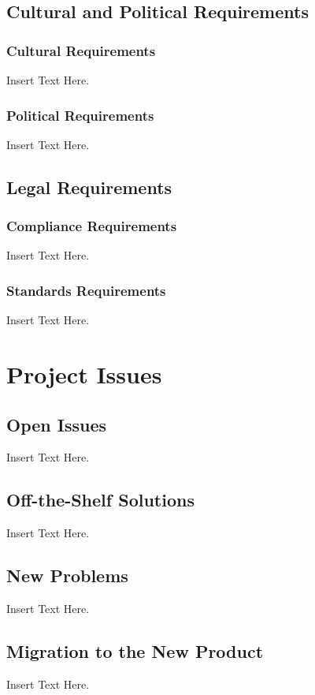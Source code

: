 \documentclass [12pt]{article}
\begin{document}
\subsection{Cultural and Political Requirements } 
\subsubsection{Cultural Requirements }
		Insert Text Here.

\subsubsection{Political Requirements }
		Insert Text Here.


\subsection{Legal Requirements}
\subsubsection{Compliance Requirements }
		Insert Text Here.
\subsubsection{Standards Requirements }
		Insert Text Here.





\section {Project Issues} 


\subsection{Open Issues}
	Insert Text Here.

\subsection{Off-the-Shelf Solutions}
	Insert Text Here.

\subsection{New Problems}
	Insert Text Here.

\subsection{Migration to the New Product} 
	Insert Text Here.
\end{document}
